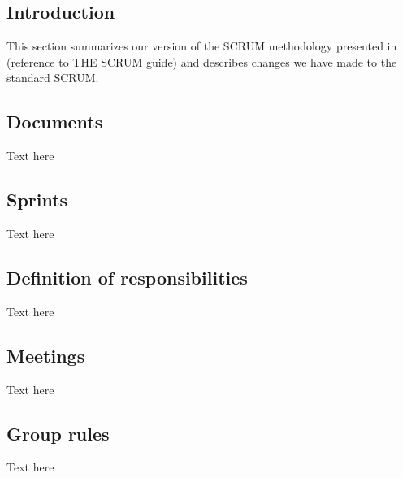 
\subsection{Introduction}
This section summarizes our version of the SCRUM methodology presented in (reference to THE SCRUM guide) and describes changes we have made to the standard SCRUM.  

\subsection{Documents}
Text here

\subsection{Sprints}
Text here

\subsection{Definition of responsibilities}
Text here

\subsection{Meetings}
Text here

\subsection{Group rules}
Text here